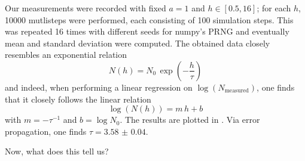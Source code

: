 Our measurements were recorded with fixed $a=1$ and $h\in[0.5,16]$; for each
$h$, \num{10000} mutlisteps were performed, each consisting of 100 simulation
steps. This was repeated 16 times with different seeds for numpy's PRNG and
eventually mean and standard deviation were computed. The obtained data closely
resembles an exponential relation
\begin{equation*}
    N(h)=N_0\,\exp\left(-\frac{h}{\tau}\right)
\end{equation*}
and indeed, when performing a linear regression on
$\log(N_{\mathrm{measured}})$, one finds that it closely follows the linear
relation
\begin{equation*}
    \log\left(N(h)\right)=m\,h+b
\end{equation*}
with $m=-\tau^{-1}$ and $b=\log{N_0}$. The results are plotted in
. Via error propagation, one finds
$\tau=\num{3.58(4)}$.

Now, what does this tell us?


